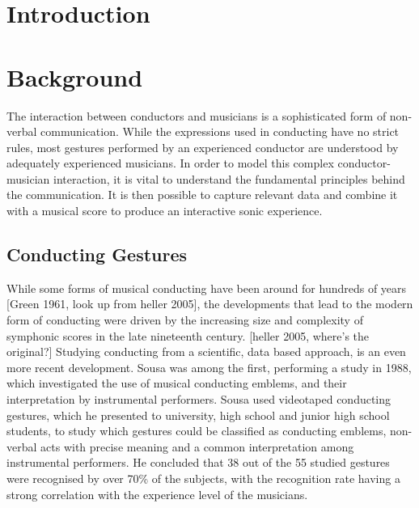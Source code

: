 \chapter{Introduction}
\label{chapter:intro}


\chapter{Background}
\label{chapter:background} 

The interaction between conductors and musicians
is a sophisticated form of non-verbal communication.
While the expressions used in conducting have no strict rules,
most gestures performed by an experienced conductor are understood by
adequately experienced musicians.
In order to model this complex conductor-musician interaction,
it is vital to understand the fundamental principles behind the communication.
It is then possible to capture relevant data
and combine it with a musical score to
produce an interactive sonic experience.

\section{Conducting Gestures}

While some forms of musical conducting have been around for hundreds of years
[Green 1961, look up from heller 2005],
the developments that lead to the modern form of conducting
were driven by the increasing size and complexity of symphonic scores
in the late nineteenth century. [heller 2005, where's the original?]
Studying conducting from a scientific, data based approach,
is an even more recent development.
Sousa \cite{} was among the first,
performing a study in 1988,
which investigated the use of musical conducting emblems,
and their interpretation by instrumental performers.
Sousa used videotaped conducting gestures,
which he presented to university, high school and junior high school students,
to study which gestures could be classified as conducting emblems,
non-verbal acts with precise meaning and
a common interpretation among instrumental performers.
He concluded that 38 out of the 55 studied gestures
were recognised by over 70\% of the subjects,
with the recognition rate having a strong correlation
with the experience level of the musicians.



